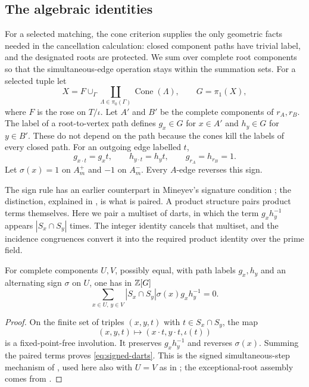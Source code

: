 \subsection{The algebraic identities}

For a selected matching, the cone criterion supplies the only geometric facts needed in the cancellation calculation: closed component paths have trivial label, and the designated roots are protected. We sum over complete root components so that the simultaneous-edge operation stays within the summation sets.
For a selected tuple let
\begin{equation}\label{eq:cone-space}
 X=F\cup_{\Gamma}\coprod_{\Lambda\in\pi_0(\Gamma)}\operatorname{Cone}(\Lambda),
 \qquad G=\pi_1(X),
\end{equation}
where $F$ is the rose on $T/\iota$. Let $A'$ and $B'$ be the complete components of $r_A,r_B$. The label of a root-to-vertex path defines $g_x\in G$ for $x\in A'$ and $h_y\in G$ for $y\in B'$. These do not depend on the path because the cones kill the labels of every closed path. For an outgoing edge labelled $t$,
\[
 g_{x\cdot t}=g_xt,\qquad h_{y\cdot t}=h_yt,
 \qquad g_{r_A}=h_{r_B}=1.
\]
Let $\sigma(x)=1$ on $A_m^+$ and $-1$ on $A_m^-$. Every $A$-edge reverses this sign.

The sign rule has an earlier counterpart in Mineyev's signature condition \cite[Section~2.2]{Min24}; the distinction, explained in \cite[Section~10, ``Signed schemes'']{MD26}, is what is paired. A product structure pairs product terms themselves. Here we pair a multiset of darts, in which the term $g_xh_y^{-1}$ appears $|S_x\cap S_y|$ times. The integer identity cancels that multiset, and the incidence congruences convert it into the required product identity over the prime field.

\begin{lemma}\label{lem:signed}
For complete components $U,V$, possibly equal, with path labels $g_x,h_y$ and an alternating sign $\sigma$ on $U$, one has in $\mathbb Z[G]$
\begin{equation}\label{eq:signed-darts}
 \sum_{x\in U,\,y\in V}|S_x\cap S_y|\sigma(x)g_xh_y^{-1}=0.
\end{equation}
\end{lemma}
\begin{proof}
On the finite set of triples $(x,y,t)$ with $t\in S_x\cap S_y$, the map
\[
 (x,y,t)\longmapsto(x\cdot t,y\cdot t,\iota(t))
\]
is a fixed-point-free involution. It preserves $g_xh_y^{-1}$ and reverses $\sigma(x)$. Summing the paired terms proves \eqref{eq:signed-darts}. This is the signed simultaneous-step mechanism of \cite[Lemma~2.2]{Iva26}, used here also with $U=V$ as in \cite[Section~7]{MD26}; the exceptional-root assembly comes from \cite[Proposition~2.1]{OAI197a}.
\end{proof}

